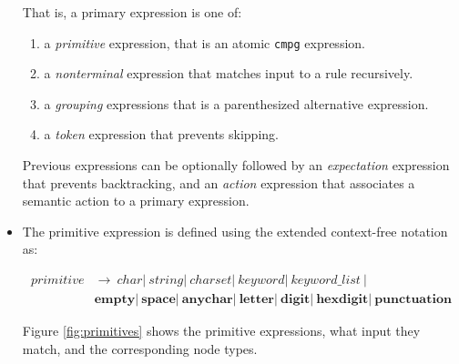 \documentclass[a4paper,oneside,11pt]{book}
\theoremstyle{definition}
\begin{document}
\begin{itemize}
That is, a primary expression is one of:

\begin{enumerate}
\item
a \emph{primitive} expression, that is an atomic \verb|cmpg| expression.
\item
a \emph{nonterminal} expression that matches input to a rule recursively.
\item
a \emph{grouping} expressions that is a parenthesized alternative expression.
\item
a \emph{token} expression that prevents skipping.
\end{enumerate}

Previous expressions can be optionally followed by an
\emph{expectation} expression that prevents backtracking,
and an \emph{action} expression that associates a semantic action to a primary expression.

\clearpage
\item
The primitive expression is defined using the extended context-free notation as:

\begin{align*}
primitive &\rightarrow \> char |\> string |\> charset |\> keyword |\> keyword\_list \> |\\
&\textbf{empty} |\> \textbf{space} |\> \textbf{anychar} |\> \textbf{letter} |\> \textbf{digit} |\> \textbf{hexdigit} |\> \textbf{punctuation}
\end{align*}

Figure \ref{fig:primitives} shows the primitive expressions, what input they match, and the corresponding node types.


\end{itemize}
\end{document}
